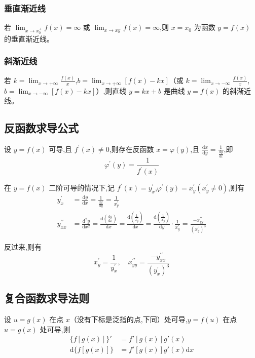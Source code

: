 \documentclass[UTF8]{ctexart}
\theoremstyle{remark}
\begin{document}
	\subsubsection{垂直渐近线}
	若 \(\lim_{x \to x_{0}^{+}} f(x) = \infty\) 或 \(\lim_{x \to x_{0}^{-}} f(x) = \infty\),则 \(x = x_{0}\) 为函数 \(y = f(x)\) 的垂直渐近线。
	
	\subsubsection{斜渐近线}
	若 \(k = \lim_{x \to +\infty} \frac{f(x)}{x}\),\(b = \lim_{x \to +\infty} [f(x) - kx]\)（或 \(k = \lim_{x \to -\infty} \frac{f(x)}{x}\),\(b = \lim_{x \to -\infty} [f(x) - kx]\)）,则直线 \(y = kx + b\) 是曲线 \(y = f(x)\) 的斜渐近线。
	
	\subsection{反函数求导公式}
	设 \(y = f(x)\) 可导,且 \(f^{\prime}(x) \neq 0\),则存在反函数 \(x = \varphi(y)\),且 \(\frac{\mathrm{d}x}{\mathrm{d}y} = \frac{1}{\frac{\mathrm{d}y}{\mathrm{d}x}}\),即
	\[
	\varphi^{\prime}(y) = \frac{1}{f^{\prime}(x)}
	\]
	
	在 \(y = f(x)\) 二阶可导的情况下,记 \(f^{\prime}(x) = y_{x}^{\prime}\),\(\varphi^{\prime}(y) = x_{y}^{\prime}(x_{y}^{\prime} \neq 0)\),则有
	\begin{align*}
		y_{x}^{\prime} &= \frac{\mathrm{d}y}{\mathrm{d}x} = \frac{1}{\frac{\mathrm{d}x}{\mathrm{d}y}} = \frac{1}{x_{y}^{\prime}}\\
		y_{xx}^{\prime\prime} &= \frac{\mathrm{d}^{2}y}{\mathrm{d}x^{2}} = \frac{\mathrm{d}(\frac{\mathrm{d}y}{\mathrm{d}x})}{\mathrm{d}x} = \frac{\mathrm{d}(\frac{1}{x_{y}^{\prime}})}{\mathrm{d}x} = \frac{\mathrm{d}(\frac{1}{x_{y}^{\prime}})}{\mathrm{d}y} \cdot \frac{1}{x_{y}^{\prime}} = \frac{-x_{yy}^{\prime\prime}}{(x_{y}^{\prime})^{3}}
	\end{align*}
	
	反过来,则有
	\[
	x_{y}^{\prime} = \frac{1}{y_{x}^{\prime}}, \quad x_{yy}^{\prime\prime} = \frac{-y_{xx}^{\prime\prime}}{(y_{x}^{\prime})^{3}}
	\]
	
	\subsection{复合函数求导法则}
	设 \(u = g(x)\) 在点 \(x\)（没有下标是泛指的点,下同）处可导,\(y = f(u)\) 在点 \(u = g(x)\) 处可导,则
	\begin{align*}
		\{f[g(x)]\}' &= f'[g(x)]g'(x)\\
		\mathrm{d}\{f[g(x)]\} &= f'[g(x)]g'(x)\mathrm{d}x
	\end{align*}
	
\end{document}
